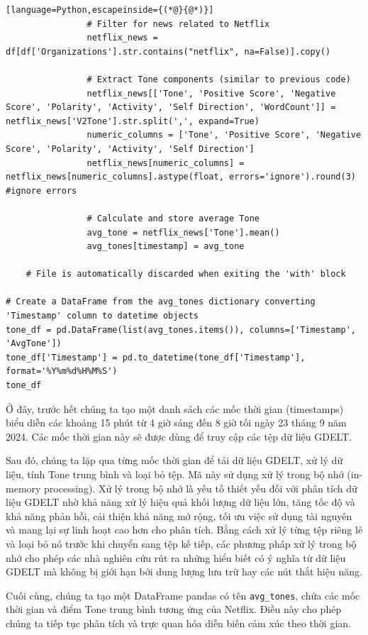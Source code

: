 \begin{lstlisting}[language=Python,escapeinside={(*@}{@*)}]
                # Filter for news related to Netflix
                netflix_news = df[df['Organizations'].str.contains("netflix", na=False)].copy()

                # Extract Tone components (similar to previous code)
                netflix_news[['Tone', 'Positive Score', 'Negative Score', 'Polarity', 'Activity', 'Self Direction', 'WordCount']] = netflix_news['V2Tone'].str.split(',', expand=True)
                numeric_columns = ['Tone', 'Positive Score', 'Negative Score', 'Polarity', 'Activity', 'Self Direction']
                netflix_news[numeric_columns] = netflix_news[numeric_columns].astype(float, errors='ignore').round(3) #ignore errors

                # Calculate and store average Tone
                avg_tone = netflix_news['Tone'].mean()
                avg_tones[timestamp] = avg_tone

    # File is automatically discarded when exiting the 'with' block

# Create a DataFrame from the avg_tones dictionary converting 'Timestamp' column to datetime objects
tone_df = pd.DataFrame(list(avg_tones.items()), columns=['Timestamp', 'AvgTone'])
tone_df['Timestamp'] = pd.to_datetime(tone_df['Timestamp'], format='%Y%m%d%H%M%S')
tone_df
\end{lstlisting}

Ở đây, trước hết chúng ta tạo một danh sách các mốc thời gian (timestamps) biểu diễn các khoảng 15 phút từ 4 giờ sáng đến 8 giờ tối ngày 23 tháng 9 năm 2024. Các mốc thời gian này sẽ được dùng để truy cập các tệp dữ liệu GDELT.

Sau đó, chúng ta lặp qua từng mốc thời gian để tải dữ liệu GDELT, xử lý dữ liệu, tính Tone trung bình và loại bỏ tệp. Mã này sử dụng xử lý trong bộ nhớ (in-memory processing). Xử lý trong bộ nhớ là yếu tố thiết yếu đối với phân tích dữ liệu GDELT nhờ khả năng xử lý hiệu quả khối lượng dữ liệu lớn, tăng tốc độ và khả năng phản hồi, cải thiện khả năng mở rộng, tối ưu việc sử dụng tài nguyên và mang lại sự linh hoạt cao hơn cho phân tích. Bằng cách xử lý từng tệp riêng lẻ và loại bỏ nó trước khi chuyển sang tệp kế tiếp, các phương pháp xử lý trong bộ nhớ cho phép các nhà nghiên cứu rút ra những hiểu biết có ý nghĩa từ dữ liệu GDELT mà không bị giới hạn bởi dung lượng lưu trữ hay các nút thắt hiệu năng.

Cuối cùng, chúng ta tạo một DataFrame pandas có tên \texttt{avg\_tones}, chứa các mốc thời gian và điểm Tone trung bình tương ứng của Netflix. Điều này cho phép chúng ta tiếp tục phân tích và trực quan hóa diễn biến cảm xúc theo thời gian.

